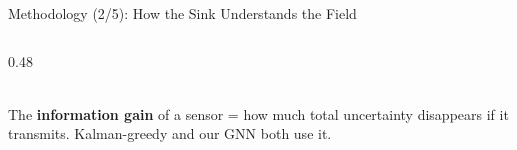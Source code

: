 \documentclass[aspectratio=169,10pt,xcolor=table]{beamer}
\begin{document}
\begin{frame}{Methodology (2/5): How the Sink Understands the Field}
\begin{columns}[T]
\begin{column}{0.48\textwidth}
\\[0.3em]
      {\scriptsize\color{muted} The \textbf{information gain} of a sensor = how much total uncertainty disappears if it
      transmits. Kalman-greedy and our GNN both use it.}
    \end{column}
  \end{columns}
\end{frame}

\end{document}
